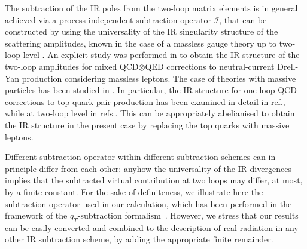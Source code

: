 \documentclass[11pt,a4paper]{article}
\begin{document}
The subtraction of the IR poles from the two-loop matrix elements is in general achieved via a process-independent subtraction operator $\mathcal{I}$,
that can be constructed by using the universality of the
IR singularity structure of the scattering amplitudes,
known in the case of a massless gauge theory up to two-loop level
\cite{Catani:1998bh,Sterman:2002qn,Becher:2009cu,Gardi:2009qi}.
%
An explicit study was performed in \cite{Kilgore:2011pa,Kilgore:2013uta}
to obtain the IR structure of the two-loop amplitudes
for mixed QCD$\otimes$QED corrections to neutral-current Drell-Yan production
considering massless leptons.
%
The case of theories with massive particles  has been studied in
\cite{Mitov:2006xs,Becher:2007cu,Becher:2009kw,Ahmed:2017gyt,Blumlein:2018tmz}.
In particular, the IR structure for one-loop QCD corrections
to top quark pair production has been examined in detail in ref.\cite{Catani:2014qha}, while at two-loop level in refs.\cite{Catani:2019iny,Catani:2019hip,Catani:2020kkl}.
This can be appropriately abelianised \cite{Buonocore:2019puv} to obtain
the IR structure in the present case
by replacing the top quarks with massive leptons.

Different subtraction operator within different subtraction schemes can in principle differ from each other:
anyhow the universality of the IR divergences implies that the subtracted virtual contribution at two loops may differ, at most, by a finite constant.
For the sake of definiteness,
we illustrate here the subtraction operator used in our calculation, which has been performed
in the framework of the $q_T$-subtraction formalism~\cite{Catani:2007vq}.
However, we stress that our results can be easily converted and combined to the
description of real radiation in any other IR subtraction scheme,
by adding the appropriate finite remainder.
\end{document}
